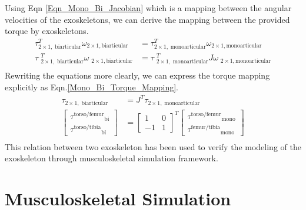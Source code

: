 \documentclass[10pt,letterpaper]{article}
\begin{document}
Using Eqn \ref{Eqn_Mono_Bi_Jacobian} which is a mapping between the angular velocities of the exoskeletons, we can derive the mapping between the provided torque by exoskeletons.
\begin{equation*}
\begin{aligned}
\tau{}_{2\times 1,\;\mathrm{biarticular}}^T \omega {}_{2\times 1,\mathrm{biarticular}} &=\tau {}_{2\times 1,\;\mathrm{monoarticular}}^T \omega {}_{2\times 1,\mathrm{monoarticular}}\\
\tau {\;}_{2\times 1,\;\mathrm{biarticular}}^T \omega {\;}_{2\times 1,\mathrm{biarticular}} &=\tau {\;}_{2\times 1,\;\mathrm{monoarticular}}^T J\omega {\;}_{2\times 1,\mathrm{monoarticular}}\\
\end{aligned}
\end{equation*}
Rewriting the equations more clearly, we can express the torque mapping explicitly as Eqn.\ref{Mono_Bi_Torque_Mapping}.
\begin{equation}\label{Mono_Bi_Torque_Mapping}
\begin{aligned}
\tau_{2\times 1,\;\mathrm{biarticular}} &=J^T \tau_{2\times 1,\;\mathrm{monoarticular}}\\
\left\lbrack \begin{array}{c}
{\tau^{\mathrm{torso}/\mathrm{femur}} }_{\mathrm{bi}} \\
{\tau^{\mathrm{torso}/\mathrm{tibia}} }_{\mathrm{bi}} 
\end{array}\right\rbrack &={\left\lbrack \begin{array}{cc}
	1 & 0\\
	-1 & 1
	\end{array}\right\rbrack }^T \left\lbrack \begin{array}{c}
{\tau^{\mathrm{torso}/\mathrm{femur}} }_{\mathrm{mono}} \\
{\tau^{\mathrm{femur}/\mathrm{tibia}} }_{\mathrm{mono}} 
\end{array}\right\rbrack\\
\end{aligned}
\end{equation}
This relation between two exoskeleton has been used to verify the modeling of the exoskeleton through musculoskeletal simulation framework.
\section*{\textbf{Musculoskeletal Simulation}}
\end{document}
